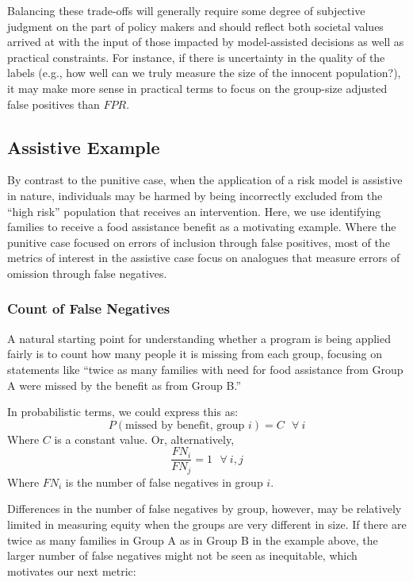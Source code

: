 \documentclass[]{krantz}
\begin{document}
Balancing these trade-offs will generally require some degree of
subjective judgment on the part of policy makers and should reflect both
societal values arrived at with the input of those impacted by
model-assisted decisions as well as practical constraints. For instance,
if there is uncertainty in the quality of the labels (e.g., how well can
we truly measure the size of the innocent population?), it may make more
sense in practical terms to focus on the group-size adjusted false
positives than \(FPR\).

\hypertarget{sec:assistiveexample}{\subsection{Assistive
Example}\label{sec:assistiveexample}}

By contrast to the punitive case, when the application of a risk model
is assistive in nature, individuals may be harmed by being incorrectly
excluded from the ``high risk'' population that receives an
intervention. Here, we use identifying families to receive a food
assistance benefit as a motivating example. Where the punitive case
focused on errors of inclusion through false positives, most of the
metrics of interest in the assistive case focus on analogues that
measure errors of omission through false negatives.

\subsubsection{Count of False Negatives}\label{count-of-false-negatives}

A natural starting point for understanding whether a program is being
applied fairly is to count how many people it is missing from each
group, focusing on statements like ``twice as many families with need
for food assistance from Group A were missed by the benefit as from
Group B.''

In probabilistic terms, we could express this as:
\[P(\textrm{missed by benefit, group $i$}) = C~~~\forall~i\] Where \(C\)
is a constant value. Or, alternatively,
\[\frac{FN_i}{FN_j} = 1~~~\forall~i,j\] Where \(FN_i\) is the number of
false negatives in group \(i\).

Differences in the number of false negatives by group, however, may be
relatively limited in measuring equity when the groups are very
different in size. If there are twice as many families in Group A as in
Group B in the example above, the larger number of false negatives might
not be seen as inequitable, which motivates our next metric:
\end{document}
